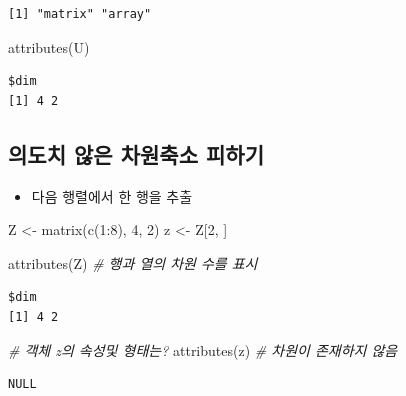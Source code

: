 \documentclass[
  11pt,
]{krantz}
\newenvironment{Shaded}{\begin{snugshade}}{\end{snugshade}}
\newcommand{\CommentTok}[1]{\textcolor[rgb]{0.37,0.37,0.37}{\textit{#1}}}
\newcommand{\DecValTok}[1]{\textcolor[rgb]{0.06,0.06,0.06}{#1}}
\newcommand{\FunctionTok}[1]{\textcolor[rgb]{0,0,0}{#1}}
\newcommand{\NormalTok}[1]{#1}
\newcommand{\OtherTok}[1]{\textcolor[rgb]{0.37,0.37,0.37}{#1}}
\newcommand{\SpecialCharTok}[1]{\textcolor[rgb]{0,0,0}{#1}}
\providecommand{\tightlist}{%
  \setlength{\itemsep}{0pt}\setlength{\parskip}{0pt}}
\begin{document}
\begin{verbatim}
[1] "matrix" "array" 
\end{verbatim}

\begin{Shaded}
\begin{Highlighting}[]
\FunctionTok{attributes}\NormalTok{(U)}
\end{Highlighting}
\end{Shaded}

\begin{verbatim}
$dim
[1] 4 2
\end{verbatim}

\normalsize

\hypertarget{mat-dim-reduc-sway}{%
\subsection{의도치 않은 차원축소 피하기}\label{mat-dim-reduc-sway}}

\begin{itemize}
\tightlist
\item
  다음 행렬에서 한 행을 추출
\end{itemize}

\footnotesize

\begin{Shaded}
\begin{Highlighting}[]
\NormalTok{Z }\OtherTok{\textless{}{-}} \FunctionTok{matrix}\NormalTok{(}\FunctionTok{c}\NormalTok{(}\DecValTok{1}\SpecialCharTok{:}\DecValTok{8}\NormalTok{), }\DecValTok{4}\NormalTok{, }\DecValTok{2}\NormalTok{)}
\NormalTok{z }\OtherTok{\textless{}{-}}\NormalTok{ Z[}\DecValTok{2}\NormalTok{, ]}

\FunctionTok{attributes}\NormalTok{(Z) }\CommentTok{\# 행과 열의 차원 수를 표시}
\end{Highlighting}
\end{Shaded}

\begin{verbatim}
$dim
[1] 4 2
\end{verbatim}

\begin{Shaded}
\begin{Highlighting}[]
\CommentTok{\# 객체 z의 속성및 형태는? }
\FunctionTok{attributes}\NormalTok{(z) }\CommentTok{\# 차원이 존재하지 않음}
\end{Highlighting}
\end{Shaded}

\begin{verbatim}
NULL
\end{verbatim}
\end{document}
